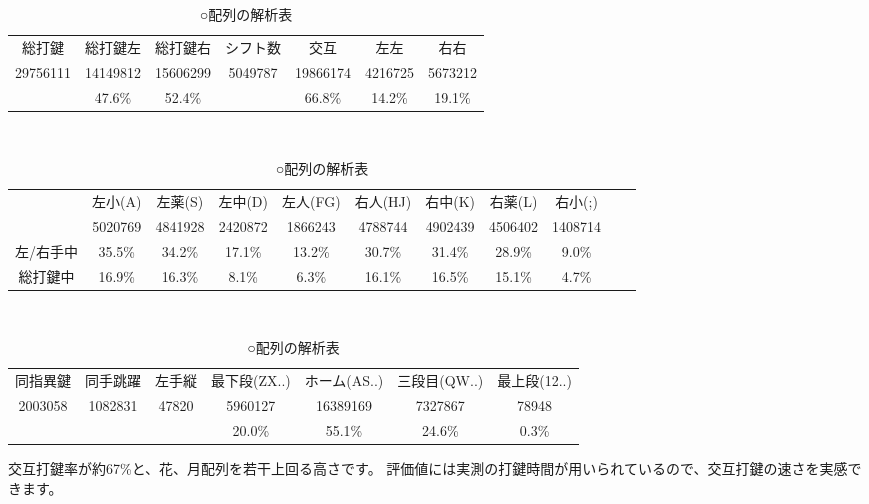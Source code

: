 \begin{table}[htbp]
 \caption{○配列の解析表}
 \begin{center}
 \begin{tabular}{cccc|ccc}
 \hline
総打鍵 & 総打鍵左 & 総打鍵右 & シフト数 & 交互 & 左左 & 右右 \\
29756111 & 14149812 & 15606299 & 5049787 & 19866174 & 4216725 & 5673212\\
 & 47.6\% & 52.4\% &  & 66.8\% & 14.2\% & 19.1\%\\
 \hline
 \end{tabular}

 　\vspace{1zw}　

 \begin{tabular}{ccccccccccc}
 \hline
& 左小(A) & 左薬(S) & 左中(D) & 左人(FG) & 右人(HJ) & 右中(K) & 右薬(L) & 右小(;)\\
& 5020769 & 4841928 & 2420872 & 1866243 & 4788744 & 4902439 & 4506402 & 1408714\\
左/右手中 &35.5\% & 34.2\% & 17.1\% & 13.2\% & 30.7\% & 31.4\% & 28.9\% & 9.0\%\\
総打鍵中 & 16.9\% & 16.3\% & 8.1\% & 6.3\% & 16.1\% & 16.5\% & 15.1\% & 4.7\%\\
\hline
 \end{tabular}

 　\vspace{1zw}　

 \begin{tabular}{ccc|cccc}
 \hline
 同指異鍵 & 同手跳躍 & 左手縦 & 最下段(ZX..) & ホーム(AS..) & 三段目(QW..) & 最上段(12..)\\
2003058 & 1082831 & 47820 & 5960127 & 16389169 & 7327867 & 78948\\
 &  &  & 20.0\% & 55.1\% & 24.6\% & 0.3\%\\
\hline
 \end{tabular}
 \end{center}
 \label{tbl:maru}
\end{table}


交互打鍵率が約67\%と、花、月配列を若干上回る高さです。
評価値には実測の打鍵時間が用いられているので、交互打鍵の速さを実感できます。

